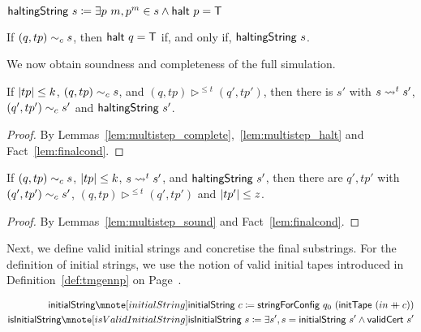 \begin{definition}
  $\textsf{haltingString}~s \coloneqq \exists p~m, p^m \in s \land \textsf{halt}~p = \mathsf{T}$
\end{definition}

\begin{fact}[][finalCondition]\label{lem:finalcond}
  If $(q, tp) \sim_c{} s$, then $\textsf{halt}~q = \mathsf{T}$ if, and only if, $\textsf{haltingString}~s$. 
\end{fact}

We now obtain soundness and completeness of the full simulation.
\begin{theorem}[Completeness][completeness]
  If $|tp| \le k$, $(q, tp) \sim_c{} s$, and $(q, tp) \rhd^{\le  t} (q', tp')$, then there is $s'$ with $s \rightsquigarrow_{}^t s'$, $(q', tp') \sim_c{} s'$ and $\textsf{haltingString}~s'$. 
\end{theorem}
\begin{proof}
  By Lemmas~\ref{lem:multistep_complete},~\ref{lem:multistep_halt} and Fact~\ref{lem:finalcond}.
\end{proof}


\begin{theorem}[Soundness][soundness]
  If $(q, tp) \sim_c{} s$, $|tp| \le k$, $s \rightsquigarrow_{}^t s'$, and $\textsf{haltingString}~s'$, then there are $q', tp'$ with $(q', tp') \sim_c{} s'$, $(q, tp) \rhd^{\le t} (q', tp')$ and $|tp'| \le z$. 
\end{theorem}
\begin{proof}
  By Lemmas~\ref{lem:multistep_sound} and Fact~\ref{lem:finalcond}.
\end{proof}

Next, we define valid initial strings and concretise the final substrings. 
For the definition of initial strings, we use the notion of valid initial tapes introduced in Definition~\ref{def:tmgennp} on Page~\pageref{def:tmgennp}.

\newcommand{\initString}{\textsf{initialString}}
\newcommand{\isInitString}{\textsf{isInitialString}}

\begin{definition}
  \begin{align*}
    \mnotec[initialString]{\initString}~c \defeq \stringForConfig~q_0~(\textsf{initTape}~(in \concat c)) \\
    \mnotec[isValidInitialString]{\isInitString}~s \defeq \exists s', s = \initString~s' \land \validCert{s'}
  \end{align*}
\end{definition}

